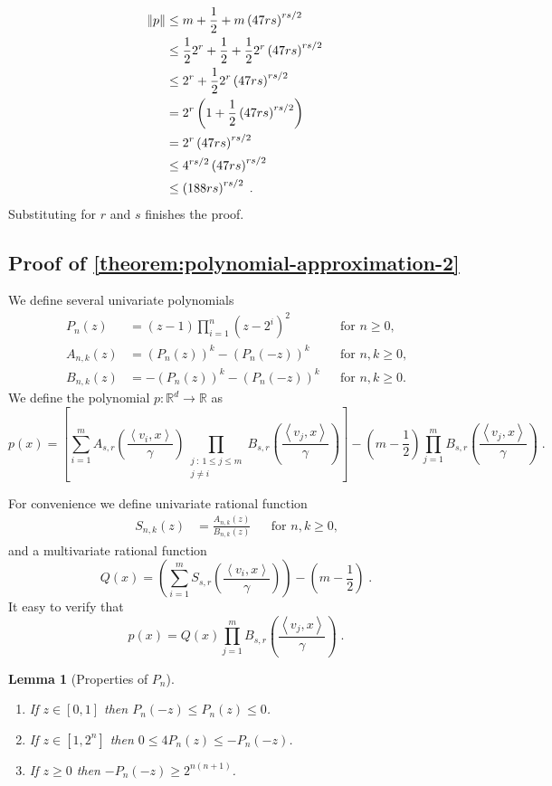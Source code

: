 \documentclass[12pt]{article}
\newtheorem{lemma}[definition]{Lemma}
\newcommand{\R}{\mathbb{R}}  %
\newcommand{\ip}[2]{\left\langle #1, #2 \right\rangle} %
\begin{document}
\begin{align*}
\norm{p}
& \le m + \frac{1}{2} + m \left(47 rs \right)^{rs/2} \\
& \le \frac{1}{2} 2^r + \frac{1}{2} + \frac{1}{2} 2^r \left(47 rs \right)^{rs/2} \\
& \le 2^r + \frac{1}{2} 2^r \left(47 rs \right)^{rs/2} \\
& = 2^r \left(1 + \frac{1}{2} \left(47 rs \right)^{rs/2} \right) \\
& = 2^r \left(47 rs \right)^{rs/2} \\
& \le 4^{rs/2} \left(47 rs \right)^{rs/2} \\
& \le \left(188 rs \right)^{rs/2} \; .
\end{align*}
Substituting for $r$ and $s$ finishes the proof.


\subsection{Proof of \autoref{theorem:polynomial-approximation-2}}
\label{section:proof-of-polynomial-approximation-2}

We define several univariate polynomials
\begin{align*}
P_n(z) & = (z - 1) \prod_{i=1}^n (z - 2^i)^2 && \text{for $n \ge 0$,} \\
A_{n,k}(z) & = (P_n(z))^k - (P_n(-z))^k && \text{for $n,k \ge 0$,} \\
B_{n,k}(z) & = - (P_n(z))^k - (P_n(-z))^k && \text{for $n,k \ge 0$.}
\end{align*}
We define the polynomial $p:\R^d \to \R$ as
$$
p(x) = \left[ \sum_{i=1}^m A_{s,r}\left( \frac{\ip{v_i}{x}}{\gamma} \right) \prod_{\substack{j ~:~ 1 \le j \le m \\ j \neq i}} B_{s,r} \left( \frac{\ip{v_j}{x}}{\gamma} \right) \right]
- \left(m - \frac{1}{2} \right) \prod_{j=1}^m B_{s,r} \left( \frac{\ip{v_j}{x}}{\gamma} \right) \; .
$$

For convenience we define univariate rational function
\begin{align*}
S_{n,k}(z) & = \frac{A_{n,k}(z)}{B_{n,k}(z)} && \text{for $n,k \ge 0$,}
\end{align*}
and a multivariate rational function
$$
Q(x) = \left( \sum_{i=1}^m S_{s,r}\left( \frac{\ip{v_i}{x}}{\gamma} \right) \right) - \left(m - \frac{1}{2} \right) \; .
$$
It easy to verify that
$$
p(x) = Q(x) \prod_{j=1}^m B_{s,r} \left( \frac{\ip{v_j}{x}}{\gamma} \right) \; .
$$

\begin{lemma}[Properties of $P_n$]
\label{lemma:properties-of-p-n}
\hspace{1cm} %
\begin{enumerate}
\item If $z \in [0,1]$ then $P_n(-z) \le P_n(z) \le 0$.
\item If $z \in [1,2^n]$ then $0 \le 4P_n(z) \le -P_n(-z)$.
\item If $z \ge 0$ then $-P_n(-z) \ge 2^{n(n+1)}$.
\end{enumerate}
\end{lemma}
\end{document}
